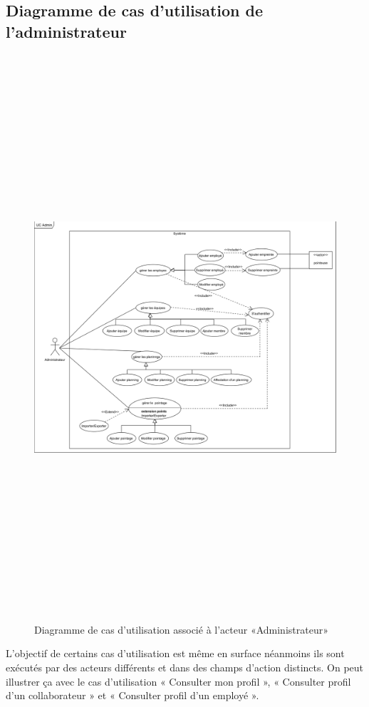     \subsection{Diagramme de cas d'utilisation de l'administrateur}
        \begin{figure}[h!]
             \centering
             \includegraphics[angle=90, height=21cm]{images/uc_admin.png}
             \caption{Diagramme de cas d'utilisation associé à l'acteur «Administrateur»}
             \label{fig5}
        \end{figure}
\clearpage
L’objectif de certains cas d’utilisation est même en surface néanmoins ils sont exécutés par des acteurs différents et dans des champs d’action distincts. On peut illustrer ça avec le cas d’utilisation « Consulter mon profil », « Consulter profil d’un collaborateur » et « Consulter profil d’un employé ». 

